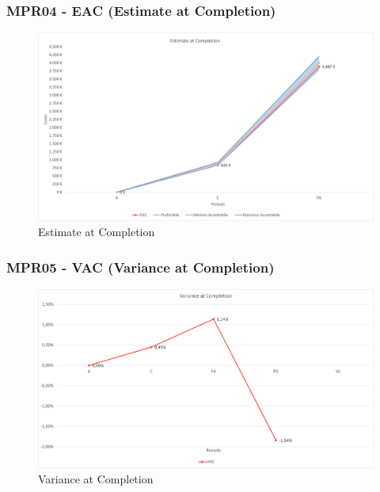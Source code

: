 \subsubsection{MPR04 - EAC (Estimate at Completion)}
\begin{figure}[!ht]
    \caption{Estimate at Completion}
    \vspace{10px}
    \includegraphics[scale=0.5]{sezioni/immagini/EstimateAtCompletion.png}
    \centering
\end{figure}
\subsubsection{MPR05 - VAC (Variance at Completion)}
\begin{figure}[!ht]
    \caption{Variance at Completion}
    \vspace{10px}
    \includegraphics[scale=0.5]{sezioni/immagini/VarianceAtCompletion.png}
    \centering
\end{figure}
\pagebreak
